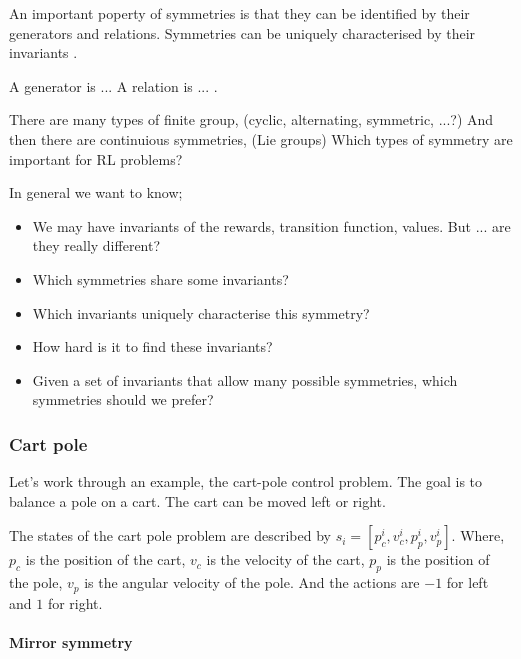 An important poperty of symmetries is that they can be identified by their generators and relations.
Symmetries can be uniquely characterised by their invariants \cite{PeterOlver1999}.

{\color{red}A generator is ... A relation is ... .}

There are many types of finite group, (cyclic, alternating, symmetric, ...?)
And then there are continuious symmetries, (Lie groups)
Which types of symmetry are important for RL problems?


In general we want to know;

\begin{itemize}
	\tightlist
	\item We may have invariants of the rewards, transition function, values. But ... are they really different?
	\item Which symmetries share some invariants?
	\item Which invariants uniquely characterise this symmetry?
  \item How hard is it to find these invariants?
  \item Given a set of invariants that allow many possible symmetries, which symmetries should we prefer?
\end{itemize}

\subsubsection{Cart pole}

Let's work through an example, the cart-pole control problem. The goal is to balance a pole on a cart.
The cart can be moved left or right.

The states of the cart pole problem are described by $s_i = [p_c^i, v_c^i, p_p^i, v_p^i]$\footnotemark. Where, $p_c$ is the position of the cart, $v_c$ is the velocity of the cart, $p_p$ is the position of the pole, $v_p$ is the angular velocity of the pole. And the actions are $-1$ for left and $1$ for right.


\paragraph{Mirror symmetry}

